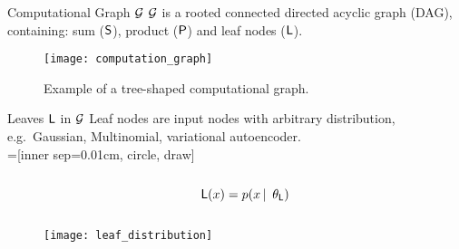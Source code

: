 \begin{frame}{Computational Graph $\mathcal{G}$}
 $\mathcal{G}$ is a rooted connected directed acyclic graph (DAG), containing: sum ($\mathsf{S}$), product ($\mathsf{P}$) and leaf nodes ($\mathsf{L}$).

\begin{figure}
  \texttt{[image: computation\_graph]}
  \caption{Example of a tree-shaped computational graph.}
\end{figure}
\end{frame}

\begin{frame}{Leaves $\mathsf{L}$ in $\mathcal{G}$}
 Leaf nodes are input nodes with arbitrary distribution, e.g.~Gaussian, Multinomial, variational autoencoder.\\[1em]

=[inner sep=0.01cm, circle, draw]
\begin{columns}
\begin{column}{.2\linewidth}
\end{column}
\begin{column}{.2\linewidth}
\end{column}
\begin{column}{.4\linewidth}
$\Leaf(x) = p(x \cbar \tp_\Leaf)$
\end{column}
\begin{column}{.2\linewidth}
\end{column}
\end{columns}

\centering
\begin{figure}
\texttt{[image: leaf\_distribution]}
\end{figure}
\end{frame}

